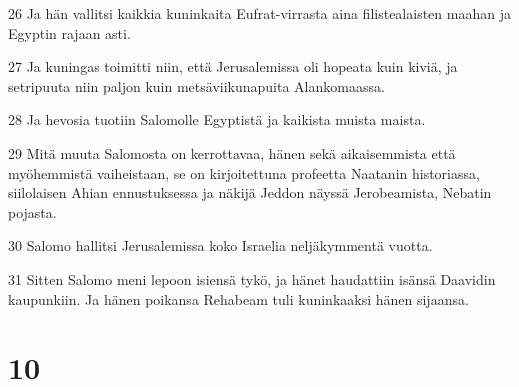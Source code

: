 \par 26 Ja hän vallitsi kaikkia kuninkaita Eufrat-virrasta aina filistealaisten maahan ja Egyptin rajaan asti.
\par 27 Ja kuningas toimitti niin, että Jerusalemissa oli hopeata kuin kiviä, ja setripuuta niin paljon kuin metsäviikunapuita Alankomaassa.
\par 28 Ja hevosia tuotiin Salomolle Egyptistä ja kaikista muista maista.
\par 29 Mitä muuta Salomosta on kerrottavaa, hänen sekä aikaisemmista että myöhemmistä vaiheistaan, se on kirjoitettuna profeetta Naatanin historiassa, siilolaisen Ahian ennustuksessa ja näkijä Jeddon näyssä Jerobeamista, Nebatin pojasta.
\par 30 Salomo hallitsi Jerusalemissa koko Israelia neljäkymmentä vuotta.
\par 31 Sitten Salomo meni lepoon isiensä tykö, ja hänet haudattiin isänsä Daavidin kaupunkiin. Ja hänen poikansa Rehabeam tuli kuninkaaksi hänen sijaansa.

\chapter{10}

